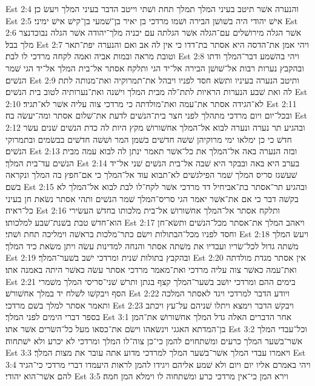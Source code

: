 Est 2:4  והנערה אשׁר תיטב בעיני המלך תמלך תחת ושׁתי וייטב הדבר בעיני המלך ויעשׂ כן׃
Est 2:5  אישׁ יהודי היה בשׁושׁן הבירה ושׁמו מרדכי בן יאיר בן־שׁמעי בן־קישׁ אישׁ ימיני׃
Est 2:6  אשׁר הגלה מירושׁלים עם־הגלה אשׁר הגלתה עם יכניה מלך־יהודה אשׁר הגלה נבוכדנצר מלך בבל׃
Est 2:7  ויהי אמן את־הדסה היא אסתר בת־דדו כי אין לה אב ואם והנערה יפת־תאר וטובת מראה ובמות אביה ואמה לקחה מרדכי לו לבת׃
Est 2:8  ויהי בהשׁמע דבר־המלך ודתו ובהקבץ נערות רבות אל־שׁושׁן הבירה אל־יד הגי ותלקח אסתר אל־בית המלך אל־יד הגי שׁמר הנשׁים׃
Est 2:9  ותיטב הנערה בעיניו ותשׂא חסד לפניו ויבהל את־תמרוקיה ואת־מנותה לתת לה ואת שׁבע הנערות הראיות לתת־לה מבית המלך וישׁנה ואת־נערותיה לטוב בית הנשׁים׃
Est 2:10  לא־הגידה אסתר את־עמה ואת־מולדתה כי מרדכי צוה עליה אשׁר לא־תגיד׃
Est 2:11  ובכל־יום ויום מרדכי מתהלך לפני חצר בית־הנשׁים לדעת את־שׁלום אסתר ומה־יעשׂה בה׃
Est 2:12  ובהגיע תר נערה ונערה לבוא אל־המלך אחשׁורושׁ מקץ היות לה כדת הנשׁים שׁנים עשׂר חדשׁ כי כן ימלאו ימי מרוקיהן שׁשׁה חדשׁים בשׁמן המר ושׁשׁה חדשׁים בבשׂמים ובתמרוקי הנשׁים׃
Est 2:13  ובזה הנערה באה אל־המלך את כל־אשׁר תאמר ינתן לה לבוא עמה מבית הנשׁים עד־בית המלך׃
Est 2:14  בערב היא באה ובבקר היא שׁבה אל־בית הנשׁים שׁני אל־יד שׁעשׁגז סריס המלך שׁמר הפילגשׁים לא־תבוא עוד אל־המלך כי אם־חפץ בה המלך ונקראה בשׁם׃
Est 2:15  ובהגיע תר־אסתר בת־אביחיל דד מרדכי אשׁר לקח־לו לבת לבוא אל־המלך לא בקשׁה דבר כי אם את־אשׁר יאמר הגי סריס־המלך שׁמר הנשׁים ותהי אסתר נשׂאת חן בעיני כל־ראיה׃
Est 2:16  ותלקח אסתר אל־המלך אחשׁורושׁ אל־בית מלכותו בחדשׁ העשׂירי הוא־חדשׁ טבת בשׁנת־שׁבע למלכותו׃
Est 2:17  ויאהב המלך את־אסתר מכל־הנשׁים ותשׂא־חן וחסד לפניו מכל־הבתולות וישׂם כתר־מלכות בראשׁה וימליכה תחת ושׁתי׃
Est 2:18  ויעשׂ המלך משׁתה גדול לכל־שׂריו ועבדיו את משׁתה אסתר והנחה למדינות עשׂה ויתן משׂאת כיד המלך׃
Est 2:19  ובהקבץ בתולות שׁנית ומרדכי ישׁב בשׁער־המלך׃
Est 2:20  אין אסתר מגדת מולדתה ואת־עמה כאשׁר צוה עליה מרדכי ואת־מאמר מרדכי אסתר עשׂה כאשׁר היתה באמנה אתו׃
Est 2:21  בימים ההם ומרדכי יושׁב בשׁער־המלך קצף בגתן ותרשׁ שׁני־סריסי המלך משׁמרי הסף ויבקשׁו לשׁלח יד במלך אחשׁורשׁ׃
Est 2:22  ויודע הדבר למרדכי ויגד לאסתר המלכה ותאמר אסתר למלך בשׁם מרדכי׃
Est 2:23  ויבקשׁ הדבר וימצא ויתלו שׁניהם על־עץ ויכתב בספר דברי הימים לפני המלך׃
Est 3:1  אחר הדברים האלה גדל המלך אחשׁורושׁ את־המן בן־המדתא האגגי וינשׂאהו וישׂם את־כסאו מעל כל־השׂרים אשׁר אתו׃
Est 3:2  וכל־עבדי המלך אשׁר־בשׁער המלך כרעים ומשׁתחוים להמן כי־כן צוה־לו המלך ומרדכי לא יכרע ולא ישׁתחוה׃
Est 3:3  ויאמרו עבדי המלך אשׁר־בשׁער המלך למרדכי מדוע אתה עובר את מצות המלך׃
Est 3:4  ויהי באמרם אליו יום ויום ולא שׁמע אליהם ויגידו להמן לראות היעמדו דברי מרדכי כי־הגיד להם אשׁר־הוא יהודי׃
Est 3:5  וירא המן כי־אין מרדכי כרע ומשׁתחוה לו וימלא המן חמה׃

